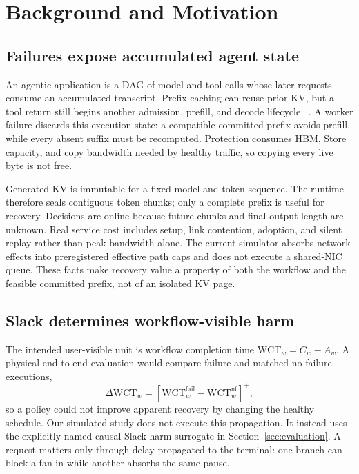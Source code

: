 \section{Background and Motivation}
\label{sec:background}

\subsection{Failures expose accumulated agent state}

An agentic application is a DAG of model and tool calls whose later requests
consume an accumulated transcript.  Prefix caching can reuse prior KV, but a
tool return still begins another admission, prefill, and decode lifecycle
~\cite{abhyankar2024infercept}.  A worker failure discards this execution
state: a compatible committed prefix avoids prefill, while every absent suffix
must be recomputed.  Protection consumes HBM, Store capacity, and copy
bandwidth needed by healthy traffic, so copying every live byte is not free.

Generated KV is immutable for a fixed model and token sequence.  The runtime
therefore seals contiguous token chunks; only a complete prefix is useful for
recovery.  Decisions are online because future chunks and final output length
are unknown.  Real service cost includes setup, link contention, adoption, and
silent replay rather than peak bandwidth alone.  The current simulator absorbs
network effects into preregistered effective path caps and does not execute a
shared-NIC queue.  These facts make recovery value a property of both the
workflow and the feasible committed prefix, not of an isolated KV page.

\subsection{Slack determines workflow-visible harm}

The intended user-visible unit is workflow completion time
$\mathrm{WCT}_w=C_w-A_w$.  A physical end-to-end evaluation would compare
failure and matched no-failure executions,
\begin{equation}
 \Delta\mathrm{WCT}_w=
 [\mathrm{WCT}^{\mathrm{fail}}_w-\mathrm{WCT}^{\mathrm{nf}}_w]^+,
 \label{eq:motivation-delta-wct}
\end{equation}
so a policy could not improve apparent recovery by changing the healthy
schedule.  Our simulated study does not execute this propagation.  It instead
uses the explicitly named causal-Slack harm surrogate in
Section~\ref{sec:evaluation}.  A request matters only through delay propagated
to the terminal: one branch can block a fan-in while another absorbs the same
pause.

